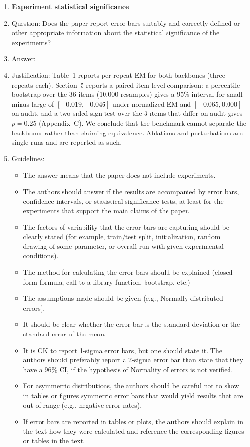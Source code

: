\begin{enumerate}
\item {\bf Experiment statistical significance}
    \item[] Question: Does the paper report error bars suitably and correctly defined or other appropriate information about the statistical significance of the experiments?
    \item[] Answer: \answerYes{}
    \item[] Justification: Table~1 reports per-repeat EM for both backbones (three repeats each). Section~5 reports a paired item-level comparison: a percentile bootstrap over the 36 items (10{,}000 resamples) gives a 95\% interval for small minus large of $[-0.019, +0.046]$ under normalized EM and $[-0.065, 0.000]$ on audit, and a two-sided sign test over the 3 items that differ on audit gives $p=0.25$ (Appendix~C). We conclude that the benchmark cannot separate the backbones rather than claiming equivalence. Ablations and perturbations are single runs and are reported as such.
    \item[] Guidelines:
    \begin{itemize}
        \item The answer \answerNA{} means that the paper does not include experiments.
        \item The authors should answer \answerYes{} if the results are accompanied by error bars, confidence intervals, or statistical significance tests, at least for the experiments that support the main claims of the paper.
        \item The factors of variability that the error bars are capturing should be clearly stated (for example, train/test split, initialization, random drawing of some parameter, or overall run with given experimental conditions).
        \item The method for calculating the error bars should be explained (closed form formula, call to a library function, bootstrap, etc.)
        \item The assumptions made should be given (e.g., Normally distributed errors).
        \item It should be clear whether the error bar is the standard deviation or the standard error of the mean.
        \item It is OK to report 1-sigma error bars, but one should state it. The authors should preferably report a 2-sigma error bar than state that they have a 96\% CI, if the hypothesis of Normality of errors is not verified.
        \item For asymmetric distributions, the authors should be careful not to show in tables or figures symmetric error bars that would yield results that are out of range (e.g., negative error rates).
        \item If error bars are reported in tables or plots, the authors should explain in the text how they were calculated and reference the corresponding figures or tables in the text.
    \end{itemize}


\end{enumerate}
